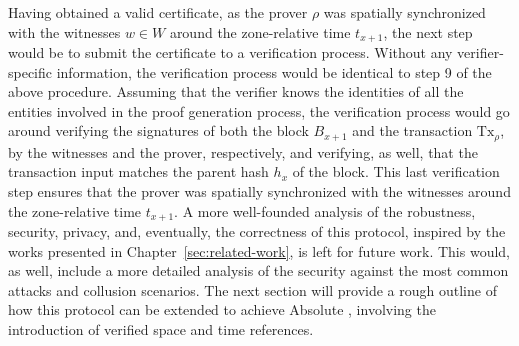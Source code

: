 Having obtained a valid \pol{} certificate, as the prover $\rho$ was spatially synchronized with the witnesses $w \in W$ around the zone-relative time $t_{x+1}$, the next step would be to submit the certificate to a verification process. Without any verifier-specific information, the verification process would be identical to step 9 of the above procedure. Assuming that the verifier knows the identities of all the entities involved in the proof generation process, the verification process would go around verifying the signatures of both the block $B_{x+1}$ and the transaction $\text{Tx}_\rho$, by the witnesses and the prover, respectively, and verifying, as well, that the transaction input matches the parent hash $h_{x}$ of the block. This last verification step ensures that the prover was spatially synchronized with the witnesses around the zone-relative time $t_{x+1}$. A more well-founded analysis of the robustness, security, privacy, and, eventually, the correctness of this \pol{} protocol, inspired by the works presented in Chapter~\ref{sec:related-work}, is left for future work. This would, as well, include a more detailed analysis of the security against the most common attacks and collusion scenarios.
The next section will provide a rough outline of how this protocol can be extended to achieve Absolute \pol{}, involving the introduction of verified space and time references.